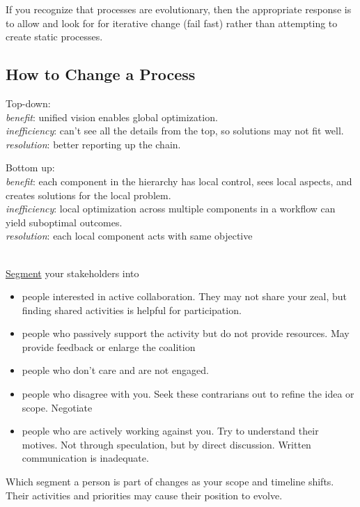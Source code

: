 If you recognize that processes are evolutionary, then the appropriate response is to allow and look for for iterative change (fail fast) rather than attempting to create static processes.

\subsection*{How to Change a Process}
Top-down:\\
\textit{benefit}: unified vision enables global optimization.\\
\textit{inefficiency}: can't see all the details from the top, so solutions may not fit well.\\
\textit{resolution}: better reporting up the chain.

Bottom up:\\
\textit{benefit}: each component in the hierarchy has local control, sees local aspects, and creates solutions for the local problem.\\
\textit{inefficiency}: local optimization across multiple components in a workflow can yield suboptimal outcomes.\\
\textit{resolution}: each local component acts with same objective

\ \\

\href{https://en.wikipedia.org/wiki/Market_segmentation}{Segment} your stakeholders into 

\begin{itemize}
 \item people interested in active collaboration. They may not share your zeal, but finding shared activities is helpful for participation.
    \item people who passively support the activity but do not provide resources. May provide feedback or enlarge the coalition
    \item people who don't care and are not engaged.
    \item people who disagree with you. Seek these contrarians out to refine the idea or scope. Negotiate
    \item people who are actively working against you. Try to understand their motives. Not through speculation, but by direct discussion. Written communication is inadequate. 
\end{itemize}

Which segment a person is part of changes as your scope and timeline shifts. Their activities and priorities may cause their position to evolve. 

